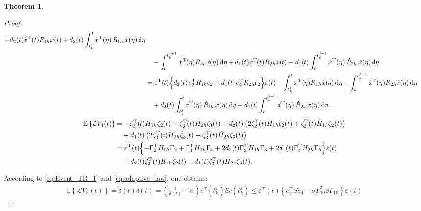 \documentclass[preprint,review,fleqn,sort&compress,3p]{elsarticle}
\theoremstyle{definition} %
\theoremstyle{definition}%
\newtheorem{thm}{Theorem}[section]
\begin{document}
\begin{thm}
\begin{proof}
\begin{align}
	+ d_2(t) \dot{x}^\mathrm{T}(t) R_{1h} \dot{x}(t)
	+ d_2(t)\int_{t_k^j}^{t} \dot{x}^\mathrm{T}(\eta)\,\dot{R}_{1h}\,\dot{x}(\eta)\,\mathrm{d}\eta \nonumber \\
	&\quad -\int_{t}^{t_{k}^{j+1}} \dot{x}^\mathrm{T}(\eta) R_{2h} \dot{x}(\eta) \,\mathrm{d}\eta
	+ d_1(t) \dot{x}^\mathrm{T}(t) R_{2h}\dot{x}(t)
	- d_1(t)\int_{t}^{t_k^{j+1}} \dot{x}^\mathrm{T}(\eta)\,\dot{R}_{2h}\,\dot{x}(\eta)\,\mathrm{d}\eta \nonumber \\
	&= \varepsilon^\mathrm{T}(t) 
	\Bigl\{ d_2(t)\, e_{2}^\mathrm{T} R_{1h} e_{2} 
	+ d_1(t)\, e_{2}^\mathrm{T} R_{2h} e_{2} \Bigr\} \varepsilon(t)  -\int_{t_k^j}^{t} \dot{x}^\mathrm{T}(\eta) R_{1h} \dot{x}(\eta) \,\mathrm{d}\eta
	-\int_{t}^{t_{k}^{j+1}} \dot{x}^\mathrm{T}(\eta) R_{2h} \dot{x}(\eta) \,\mathrm{d}\eta \nonumber \\
	&\quad + d_2(t)\int_{t_k^j}^{t} \dot{x}^\mathrm{T}(\eta)\,\dot{R}_{1h}\,\dot{x}(\eta)\,\mathrm{d}\eta
	- d_1(t)\int_{t}^{t_k^{j+1}} \dot{x}^\mathrm{T}(\eta)\,\dot{R}_{2h}\,\dot{x}(\eta)\,\mathrm{d}\eta .
\end{align}
\begin{align}
	\mathbb{E} \left\{ \mathcal{L}V_{4}(t) \right\} 
	&= -\zeta_2^{\mathrm{T}}(t) H_{1h} \zeta_2(t) + \zeta_3^{\mathrm{T}}(t) H_{2h} \zeta_3(t) + d_2(t) \left( 2\zeta_2^{\mathrm{T}}(t) H_{1h} \dot{\zeta}_2(t) + \zeta_2^{\mathrm{T}}(t) \dot{H}_{1h} \zeta_2(t) \right) \nonumber \\
	&\quad + d_1(t) \left( 2\zeta_3^{\mathrm{T}}(t) H_{2h} \dot{\zeta}_3(t) + \zeta_3^{\mathrm{T}}(t) \dot{H}_{2h} \zeta_3(t) \right) \nonumber \\
	&= \varepsilon^{\mathrm{T}}(t) 
	\Bigl\{ -\Gamma_{2}^{\mathrm{T}} H_{1h} \Gamma_{2}
	+ \Gamma_{4}^{\mathrm{T}} H_{2h} \Gamma_{4}
	+ 2d_2(t) \Gamma_{2}^{\mathrm{T}} H_{1h} \Gamma_{3}
	+ 2d_1(t) \Gamma_{4}^{\mathrm{T}} H_{2h} \Gamma_{5} \Bigr\} \varepsilon(t) \nonumber \\
	&\quad + d_2(t) \zeta_2^{\mathrm{T}}(t) \dot{H}_{1h} \zeta_2(t)
	+ d_{1}(t) \zeta_3^{\mathrm{T}}(t) \dot{H}_{2h} \zeta_3(t).
\end{align}

According to \eqref{eq:Event_TR_1} and \eqref{eq:adaptive_law}, one obtains:
\begin{align}
	\mathbb{E} \left\{ \mathcal{L}V_{5}(t) \right\}
	 = 
	\dot{\delta}(t) \delta(t)
	=\left( \frac{1}{\delta(t)} - \sigma \right) e^{\mathrm{T}}(t^j_{k}) S e(t^j_{k})
	\leq \varepsilon^{\mathrm{T}}(t) 
	\left\lbrace 
	e_{4}^{\mathrm{T}} S e_{4}  
	-\sigma \Gamma_{10}^{\mathrm{T}} S \Gamma_{10}
	\right\rbrace 
	 \varepsilon(t)
\end{align}


\end{proof}
\end{thm}
\end{document}
